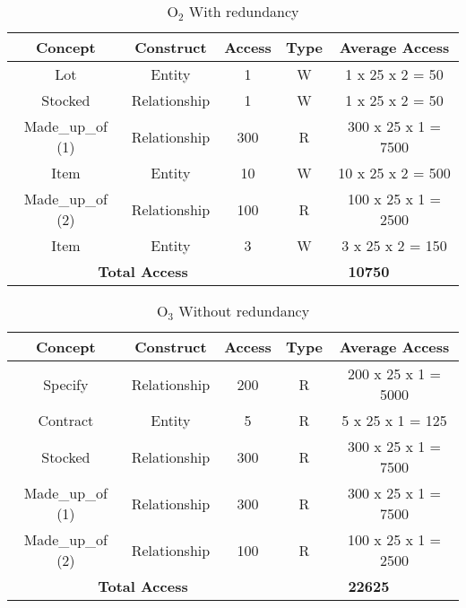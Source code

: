 \begin{table}[!h]\caption{	$ \textrm{O}_\textrm{2} $ With redundancy}
	\begin{center}
		\begin{tabular}{| c | c | c | c | c |}
			\hline
			\textbf{Concept} & \textbf{Construct} & \textbf{Access} & \textbf{Type} & \textbf{Average Access} \\ \hline
			Lot & Entity & 1 & W & 1 x 25 x 2 = 50 \\ \hline
			Stocked & Relationship & 1 & W & 1 x 25 x 2 = 50 \\ \hline
			Made\_up\_of (1) & Relationship & 300 & R & 300 x 25 x 1 = 7500 \\ \hline
			Item & Entity & 10 & W & 10 x 25 x 2 = 500 \\ \hline
			Made\_up\_of (2) & Relationship & 100 & R & 100 x 25 x 1 = 2500 \\ \hline
			Item & Entity & 3 & W & 3 x 25 x 2 = 150 \\ \hline
			\multicolumn{3}{|c|}{\textbf{Total Access}} & \multicolumn{2}{|c|}{\textbf{10750}} \\ \hline
		\end{tabular}
	\end{center}
\end{table}
\begin{table}[!h]\caption{	$ \textrm{O}_\textrm{3} $ Without redundancy }
	\begin{center}
		\begin{tabular}{| c | c | c | c | c |}
			\hline
			\textbf{Concept} & \textbf{Construct} & \textbf{Access} & \textbf{Type} & \textbf{Average Access} \\ \hline
			Specify & Relationship & 200 & R & 200 x 25 x 1 = 5000 \\ \hline
			Contract & Entity & 5 & R & 5 x 25 x 1 = 125 \\ \hline
			Stocked & Relationship & 300 & R & 300 x 25 x 1 = 7500 \\ \hline
            Made\_up\_of (1) & Relationship & 300 & R & 300 x 25 x 1 = 7500 \\ \hline
            Made\_up\_of (2) & Relationship & 100 & R & 100 x 25 x 1 = 2500 \\ \hline
			\multicolumn{3}{|c|}{\textbf{Total Access}} & \multicolumn{2}{|c|}{\textbf{22625}} \\ \hline
		\end{tabular}
	\end{center}
\end{table}
